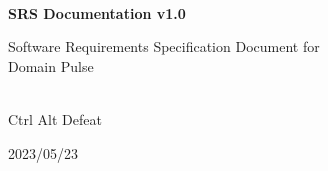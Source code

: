 \begin{titlepage}
    \centering


    
    \vspace{2cm}
    \hrulefill\\
    \vspace{1cm}
    {\Huge\bfseries SRS Documentation v1.0}
    
    \vspace{1cm}
    
    {\Large Software Requirements Specification Document for\\Domain Pulse}\\
    \vspace{1cm}
    \hrulefill\\
    
    \vfill
    
    {\large Ctrl Alt Defeat}
    
    \vspace{1cm}
    
    {\large 2023/05/23}\\
    
\end{titlepage}
  
